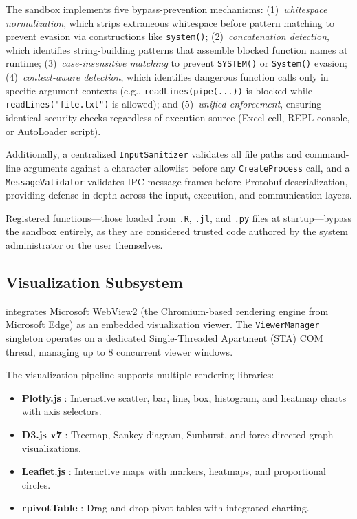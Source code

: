 The sandbox implements five bypass-prevention mechanisms: (1)~\emph{whitespace normalization}, which strips extraneous whitespace before pattern matching to prevent evasion via constructions like \texttt{sys\allowbreak tem()}; (2)~\emph{concatenation detection}, which identifies string-building patterns that assemble blocked function names at runtime; (3)~\emph{case-insensitive matching} to prevent \texttt{SYSTEM()} or \texttt{System()} evasion; (4)~\emph{context-aware detection}, which identifies dangerous function calls only in specific argument contexts (e.g., \texttt{readLines(pipe(...))} is blocked while \texttt{readLines("file.txt")} is allowed); and (5)~\emph{unified enforcement}, ensuring identical security checks regardless of execution source (Excel cell, REPL console, or AutoLoader script).

Additionally, a centralized \texttt{InputSanitizer} validates all file paths and command-line arguments against a character allowlist before any \texttt{CreateProcess} call, and a \texttt{MessageValidator} validates IPC message frames before Protobuf deserialization, providing defense-in-depth across the input, execution, and communication layers.

Registered functions---those loaded from \texttt{.R}, \texttt{.jl}, and \texttt{.py} files at startup---bypass the sandbox entirely, as they are considered trusted code authored by the system administrator or the user themselves.

\subsection{Visualization Subsystem}

\neven{} integrates Microsoft WebView2 \citep{WebView2_2023} (the Chromium-based rendering engine from Microsoft Edge) as an embedded visualization viewer. The \texttt{ViewerManager} singleton operates on a dedicated Single-Threaded Apartment (STA) COM thread, managing up to 8 concurrent viewer windows.

The visualization pipeline supports multiple rendering libraries:
\begin{itemize}
    \item \textbf{Plotly.js} \citep{Plotly2023}: Interactive scatter, bar, line, box, histogram, and heatmap charts with axis selectors.
    \item \textbf{D3.js v7} \citep{Bostock2011}: Treemap, Sankey diagram, Sunburst, and force-directed graph visualizations.
    \item \textbf{Leaflet.js} \citep{Leaflet2023}: Interactive maps with markers, heatmaps, and proportional circles.
    \item \textbf{rpivotTable} \citep{rpivotTable2023}: Drag-and-drop pivot tables with integrated charting.
\end{itemize}

